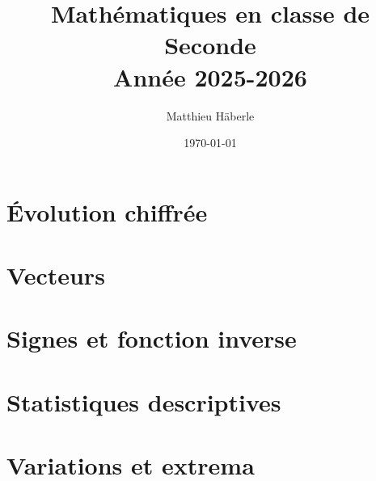 \documentclass[a4paper, 12pt]{report}
\title{\Huge{Mathématiques en classe de Seconde}\\ Année 2025-2026}
\author{\huge{Matthieu Häberle}}
\date{\today}
\begin{document}
\maketitle
\newpage%
\tableofcontents
\pagebreak









\chapter{Évolution chiffrée}











\chapter{Vecteurs}

\chapter{Signes et fonction inverse}

\chapter{Statistiques descriptives}



\chapter{Variations et extrema}


\end{document}
